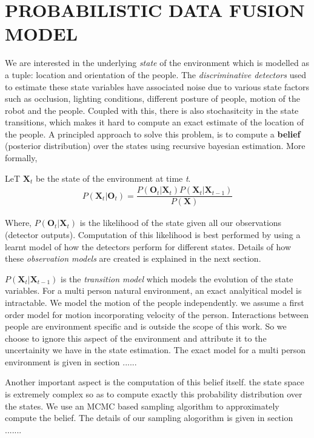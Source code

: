 \section{PROBABILISTIC DATA FUSION MODEL}
We are interested in the underlying \textit{state} of the environment which is modelled as a tuple: location and orientation of the people. The \textit{discriminative detectors} used to estimate these state variables have associated noise due to various state factors such as occlusion, lighting conditions, different posture of people, motion of the robot and the people. Coupled with this, there is also stochasitcity in the state transitions, which makes it hard to compute an exact estimate of the location of the people. A principled approach to solve this problem, is to compute a \textbf{belief} (posterior distribution) over the states using recursive bayesian estimation. More formally,

LeT $\textbf{X}_{t}$ be the state of the environment at time \textit{t}.
\begin{align}
P(\textbf{X}_{t} | \textbf{O}_{t}) = \dfrac{P(\textbf{O}_{t} | \textbf{X}_{t}) P(\textbf{X}_{t}|\textbf{X}_{t-1})} {P(\textbf{X})}
\end{align} 

Where, $P(\textbf{O}_{t} | \textbf{X}_{t})$ is the likelihood of the state given all our observations (detector outputs). Computation of this likelihood is best performed by using a learnt model of how the detectors perform for different states. Details of how these \textit{observation models} are created is explained in the next section.

$P(\textbf{X}_{t}|\textbf{X}_{t-1})$ is the \textit{transition model} which models the evolution of the state variables. For a multi person natural environment, an exact analyitical model is intractable. We model the motion of the people independently. we assume a first order model for motion incorporating velocity of the person. Interactions between people are environment specific and is outside the scope of this work. So we choose to ignore this aspect of the environment and attribute it to the uncertainity we have in the state estimation. The exact model for a multi person environment is given in section ......

Another important aspect is the computation of this belief itself. the state space is extremely complex so as to compute exactly this probability 
distribution over the states. We use an MCMC based sampling algorithm to approximately compute the belief. The details of our sampling alogorithm is given in section .......


